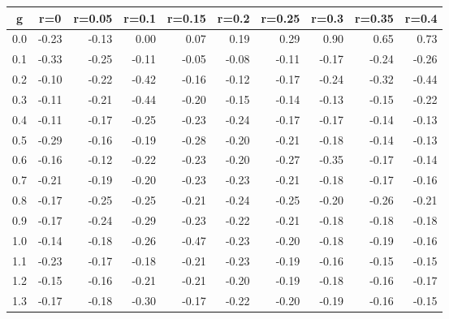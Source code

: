 %
\begin{table}[!tbp]
 \begin{center}
 \begin{tabular}{rrrrrrrrrr}\hline\hline
\multicolumn{1}{c}{g}&\multicolumn{1}{c}{r=0}&\multicolumn{1}{c}{r=0.05}&\multicolumn{1}{c}{r=0.1}&\multicolumn{1}{c}{r=0.15}&\multicolumn{1}{c}{r=0.2}&\multicolumn{1}{c}{r=0.25}&\multicolumn{1}{c}{r=0.3}&\multicolumn{1}{c}{r=0.35}&\multicolumn{1}{c}{r=0.4}\tabularnewline
\hline
0.0&-0.23&-0.13& 0.00& 0.07& 0.19& 0.29& 0.90& 0.65& 0.73\tabularnewline
0.1&-0.33&-0.25&-0.11&-0.05&-0.08&-0.11&-0.17&-0.24&-0.26\tabularnewline
0.2&-0.10&-0.22&-0.42&-0.16&-0.12&-0.17&-0.24&-0.32&-0.44\tabularnewline
0.3&-0.11&-0.21&-0.44&-0.20&-0.15&-0.14&-0.13&-0.15&-0.22\tabularnewline
0.4&-0.11&-0.17&-0.25&-0.23&-0.24&-0.17&-0.17&-0.14&-0.13\tabularnewline
0.5&-0.29&-0.16&-0.19&-0.28&-0.20&-0.21&-0.18&-0.14&-0.13\tabularnewline
0.6&-0.16&-0.12&-0.22&-0.23&-0.20&-0.27&-0.35&-0.17&-0.14\tabularnewline
0.7&-0.21&-0.19&-0.20&-0.23&-0.23&-0.21&-0.18&-0.17&-0.16\tabularnewline
0.8&-0.17&-0.25&-0.25&-0.21&-0.24&-0.25&-0.20&-0.26&-0.21\tabularnewline
0.9&-0.17&-0.24&-0.29&-0.23&-0.22&-0.21&-0.18&-0.18&-0.18\tabularnewline
1.0&-0.14&-0.18&-0.26&-0.47&-0.23&-0.20&-0.18&-0.19&-0.16\tabularnewline
1.1&-0.23&-0.17&-0.18&-0.21&-0.23&-0.19&-0.16&-0.15&-0.15\tabularnewline
1.2&-0.15&-0.16&-0.21&-0.21&-0.20&-0.19&-0.18&-0.16&-0.17\tabularnewline
1.3&-0.17&-0.18&-0.30&-0.17&-0.22&-0.20&-0.19&-0.16&-0.15\tabularnewline
\hline
\end{tabular}

\end{center}

\end{table}

